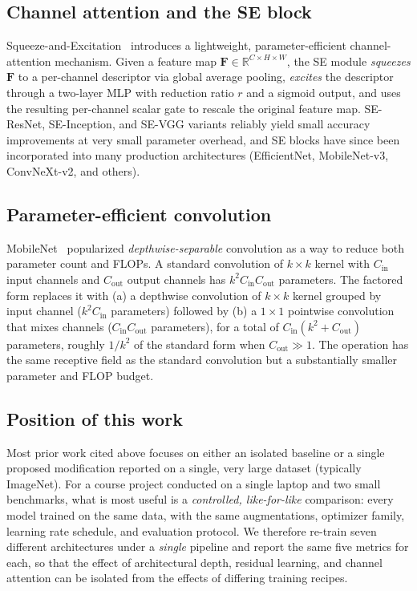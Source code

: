 \documentclass[conference,10pt]{IEEEtran}
\begin{document}
\subsection{Channel attention and the SE block}

Squeeze-and-Excitation~\cite{hu2018squeeze} introduces a lightweight,
parameter-efficient channel-attention mechanism. Given a feature
map $\mathbf{F}\in\mathbb{R}^{C\times H\times W}$, the SE module
\emph{squeezes} $\mathbf{F}$ to a per-channel descriptor via global
average pooling, \emph{excites} the descriptor through a two-layer
MLP with reduction ratio $r$ and a sigmoid output, and uses the
resulting per-channel scalar gate to rescale the original feature
map. SE-ResNet, SE-Inception, and SE-VGG variants reliably yield
small accuracy improvements at very small parameter overhead, and SE
blocks have since been incorporated into many production architectures
(EfficientNet, MobileNet-v3, ConvNeXt-v2, and others).

\subsection{Parameter-efficient convolution}

MobileNet~\cite{howard2017mobilenets} popularized
\emph{depthwise-separable} convolution as a way to reduce both
parameter count and FLOPs. A standard convolution of $k\!\times\!k$
kernel with $C_{\text{in}}$ input channels and $C_{\text{out}}$ output
channels has $k^2 C_{\text{in}} C_{\text{out}}$ parameters. The
factored form replaces it with (a) a depthwise convolution of
$k\!\times\!k$ kernel grouped by input channel ($k^2 C_{\text{in}}$
parameters) followed by (b) a $1\!\times\!1$ pointwise convolution
that mixes channels ($C_{\text{in}} C_{\text{out}}$ parameters), for a
total of $C_{\text{in}}(k^2 + C_{\text{out}})$ parameters, roughly
$1/k^2$ of the standard form when $C_{\text{out}}\!\gg\!1$. The
operation has the same receptive field as the standard convolution
but a substantially smaller parameter and FLOP budget.

\subsection{Position of this work}

Most prior work cited above focuses on either an isolated baseline or
a single proposed modification reported on a single, very large
dataset (typically ImageNet). For a course project conducted on a
single laptop and two small benchmarks, what is most useful is a
\emph{controlled, like-for-like} comparison: every model trained on
the same data, with the same augmentations, optimizer family, learning
rate schedule, and evaluation protocol. We therefore re-train seven
different architectures under a \emph{single} pipeline and report the
same five metrics for each, so that the effect of architectural
depth, residual learning, and channel attention can be isolated from
the effects of differing training recipes.
\end{document}
